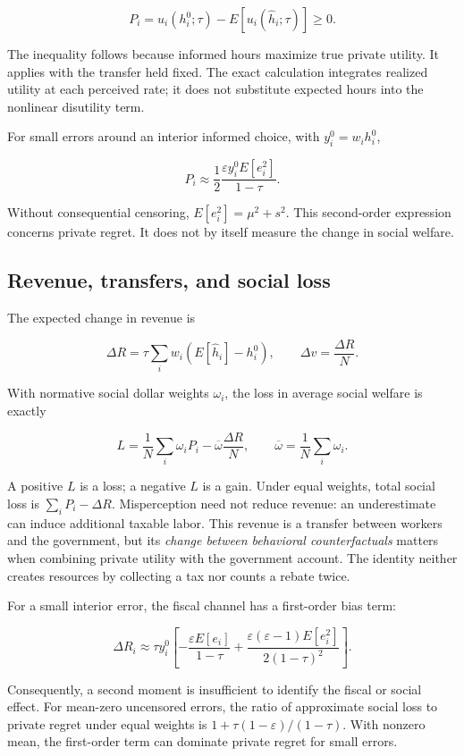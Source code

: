 \documentclass[
  11pt,
  letterpaper,
  DIV=11,
  numbers=noendperiod]{scrartcl}
\begin{document}
\[P_i=u_i(h_i^0;\tau)-E[u_i(\widehat h_i;\tau)]\geq0.\]

The inequality follows because informed hours maximize true private
utility. It applies with the transfer held fixed. The exact calculation
integrates realized utility at each perceived rate; it does not
substitute expected hours into the nonlinear disutility term.

For small errors around an interior informed choice, with
\(y_i^0=w_i h_i^0\),

\[P_i\approx\frac{1}{2}\frac{\varepsilon y_i^0 E[e_i^2]}{1-\tau}.\]

Without consequential censoring, \(E[e_i^2]=\mu^2+s^2\). This
second-order expression concerns private regret. It does not by itself
measure the change in social welfare.

\subsection{Revenue, transfers, and social
loss}\label{revenue-transfers-and-social-loss}

The expected change in revenue is

\[\Delta R=\tau\sum_iw_i(E[\widehat h_i]-h_i^0),\qquad\Delta v=\frac{\Delta R}{N}.\]

With normative social dollar weights \(\omega_i\), the loss in average
social welfare is exactly

\[L=\frac{1}{N}\sum_i\omega_iP_i-\overline\omega\frac{\Delta R}{N},\qquad\overline\omega=\frac{1}{N}\sum_i\omega_i.\]

A positive \(L\) is a loss; a negative \(L\) is a gain. Under equal
weights, total social loss is \(\sum_iP_i-\Delta R\). Misperception need
not reduce revenue: an underestimate can induce additional taxable
labor. This revenue is a transfer between workers and the government,
but its \emph{change between behavioral counterfactuals} matters when
combining private utility with the government account. The identity
neither creates resources by collecting a tax nor counts a rebate twice.

For a small interior error, the fiscal channel has a first-order bias
term:

\[\Delta R_i\approx\tau y_i^0\left[-\frac{\varepsilon E[e_i]}{1-\tau}+\frac{\varepsilon(\varepsilon-1)E[e_i^2]}{2(1-\tau)^2}\right].\]

Consequently, a second moment is insufficient to identify the fiscal or
social effect. For mean-zero uncensored errors, the ratio of approximate
social loss to private regret under equal weights is
\(1+\tau(1-\varepsilon)/(1-\tau)\). With nonzero mean, the first-order
term can dominate private regret for small errors.
\end{document}
